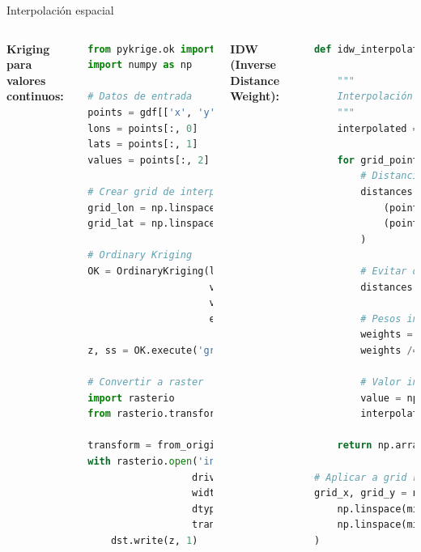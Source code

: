 \documentclass[10pt,aspectratio=169]{beamer}
\begin{document}
\begin{frame}[fragile]{Interpolación espacial}
    \begin{columns}[T]
        \textbf{Kriging para valores continuos:}
        \begin{lstlisting}[language=Python]
from pykrige.ok import OrdinaryKriging
import numpy as np

# Datos de entrada
points = gdf[['x', 'y', 'precio_m2']].values
lons = points[:, 0]
lats = points[:, 1]
values = points[:, 2]

# Crear grid de interpolación
grid_lon = np.linspace(lons.min(), lons.max(), 100)
grid_lat = np.linspace(lats.min(), lats.max(), 100)

# Ordinary Kriging
OK = OrdinaryKriging(lons, lats, values, 
                     variogram_model='spherical',
                     verbose=False, 
                     enable_plotting=False)

z, ss = OK.execute('grid', grid_lon, grid_lat)

# Convertir a raster
import rasterio
from rasterio.transform import from_origin

transform = from_origin(west, north, pixel_size, pixel_size)
with rasterio.open('interpolated.tif', 'w',
                  driver='GTiff', height=z.shape[0],
                  width=z.shape[1], count=1, 
                  dtype=z.dtype, crs='EPSG:4326',
                  transform=transform) as dst:
    dst.write(z, 1)
        \end{lstlisting}
        
        \textbf{IDW (Inverse Distance Weight):}
        \begin{lstlisting}[language=Python]
def idw_interpolation(points, values, 
                     grid_points, power=2):
    """
    Interpolación IDW simple
    """
    interpolated = []
    
    for grid_point in grid_points:
        # Distancias a todos los puntos
        distances = np.sqrt(
            (points[:, 0] - grid_point[0])**2 + 
            (points[:, 1] - grid_point[1])**2
        )
        
        # Evitar división por cero
        distances[distances == 0] = 1e-10
        
        # Pesos inversos
        weights = 1 / distances**power
        weights /= weights.sum()
        
        # Valor interpolado
        value = np.sum(weights * values)
        interpolated.append(value)
    
    return np.array(interpolated)

# Aplicar a grid regular
grid_x, grid_y = np.meshgrid(
    np.linspace(min_x, max_x, 50),
    np.linspace(min_y, max_y, 50)
)
        \end{lstlisting}
    \end{columns}
\end{frame}
\end{document}
